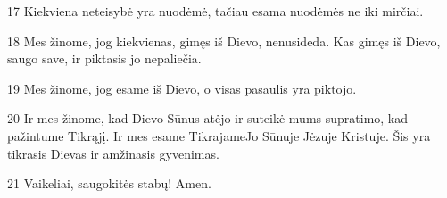 \par 17 Kiekviena neteisybė yra nuodėmė, tačiau esama nuodėmės ne iki mirčiai. 
\par 18 Mes žinome, jog kiekvienas, gimęs iš Dievo, nenusideda. Kas gimęs iš Dievo, saugo save, ir piktasis jo nepaliečia. 
\par 19 Mes žinome, jog esame iš Dievo, o visas pasaulis yra piktojo. 
\par 20 Ir mes žinome, kad Dievo Sūnus atėjo ir suteikė mums supratimo, kad pažintume Tikrąjį. Ir mes esame Tikrajame­Jo Sūnuje Jėzuje Kristuje. Šis yra tikrasis Dievas ir amžinasis gyvenimas. 
\par 21 Vaikeliai, saugokitės stabų! Amen.



